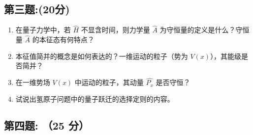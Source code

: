 \subsection{第三题:(20分)}
\begin{enumerate}
    \item 在量子力学中，若 $\hat{H}$ 不显含时间，则力学量 $\hat{A}$ 为守恒量的定义是什么？守恒量 $\hat{A}$ 的本征态有何特点？
    
    \item 本征值简并的概念是如何表达的？一维运动的粒子（势为 $V(x)$），其能级是否简并？
    
    \item 在一维势场 $V(x)$ 中运动的粒子，其动量 $\hat{P_x}$ 是否守恒？
    
    \item 试说出氢原子问题中的量子跃迁的选择定则的内容。
\end{enumerate}
\subsection{第四题: （25 分）}